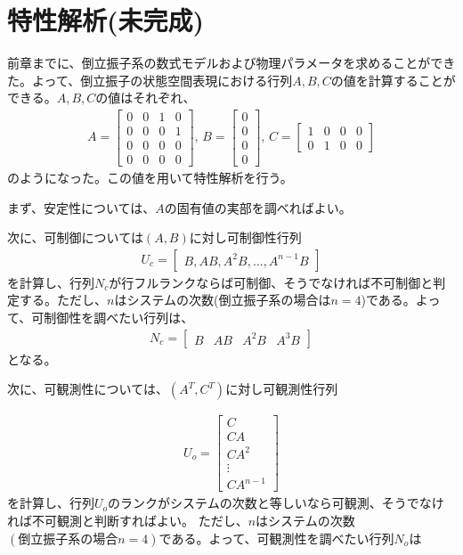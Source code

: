 \documentclass[a4j,11pt,twoside]{ujbook}
\begin{document}
	\section{特性解析(未完成)}
		前章までに、倒立振子系の数式モデルおよび物理パラメータを求めることができた。よって、倒立振子の状態空間表現における行列$A,B,C$の値を計算することができる。$A,B,C$の値はそれぞれ、
		\begin{eqnarray*}
			A = \left[
			\begin{array}{rrrr}
				0 & 0 & 1 & 0\\
				0 & 0 & 0 & 1\\
				0 & 0 & 0 & 0\\
				0 & 0 & 0 & 0
			\end{array}
			\right],\,
			B = \left[
			\begin{array}{c}
				0 \\
				0 \\
				0 \\
				0
			\end{array}
			\right],\,
			C = \left[
			\begin{array}{cccc}
				1 &  0 & 0 & 0\\
				0 &  1 & 0 & 0
			\end{array}
			\right]
		\end{eqnarray*}
		のようになった。この値を用いて特性解析を行う。
		
		まず、安定性については、$A$の固有値の実部を調べればよい。
		
		次に、可制御については$(A,B)$に対し可制御性行列
		\begin{eqnarray*}
			U_c=
			\left[
				\begin{array}{ccc}
					B , AB , A^2B , … , A^{n-1}B
				\end{array}
			\right]
		\end{eqnarray*}
		を計算し、行列$N_c$が行フルランクならば可制御、そうでなければ不可制御と判定する。ただし、$n$はシステムの次数(倒立振子系の場合は$n=4$)である。よって、可制御性を調べたい行列は、
		\begin{eqnarray*}
			N_c 
			=
			\left[
				\begin{array}{cccc}
					B & AB & A^2B & A^3B
				\end{array}
			\right]
		\end{eqnarray*}
		となる。
		
		次に、可観測性については、$(A^T,C^T)$に対し可観測性行列
		
		\begin{eqnarray*}
			U_o = \left[
			\begin{array}{c}
				C\\
				CA\\
				CA^2\\
				\vdots\\
				CA^{n-1}
			\end{array}
			\right]
		\end{eqnarray*}
		を計算し、行列$U_o$のランクがシステムの次数と等しいなら可観測、そうでなければ不可観測と判断すればよい。	ただし、$n$はシステムの次数$(倒立振子系の場合n=4)$である。よって、可観測性を調べたい行列$N_o$は
		
\end{document}
